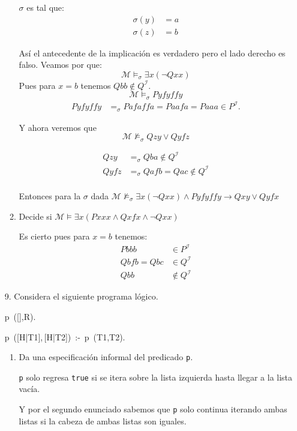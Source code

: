 \documentclass[11pt,letterpaper]{article}
\begin{document}
\begin{enumerate}
\begin{enumerate}
    $\sigma$ es tal que:
    \begin{align*}
      \sigma(y) &= a\\
      \sigma(z) &= b
    \end{align*}

    Así el antecedente de la implicación es verdadero pero
    el lado derecho es falso. Veamos por que:
    $$\mathcal{M}\models_\sigma \exists x(\neg Qxx)$$
    Pues para $x = b$ tenemos $Qbb\notin Q^\mathcal{I}$.
    $$\mathcal{M}\models_\sigma Pyfyffy$$
    \begin{align*}
      Pyfyffy &=_\sigma Pafaffa = Paafa = Paaa \in P^\mathcal{I}.
    \end{align*}

    Y ahora veremos que
    $$\mathcal{M} \not\models_\sigma  Qzy \lor Qyfz$$

    \begin{align*}
      Qzy &=_\sigma Q ba \notin Q^\mathcal{I}\\
      Qyfz &=_\sigma Q afb = Qac \notin Q^\mathcal{I}\\
    \end{align*}

    Entonces para la $\sigma$ dada     $\mathcal{M} \not\models_\sigma \exists x(\neg Qxx) \land P yfyffy
    \rightarrow Qxy \lor Qyfx$
  \item  Decide si $\mathcal{M} \models \exists x(P xxx \land Qxfx \land\neg Qxx)$
    
    Es cierto pues para $x=b$ tenemos:
    \begin{align*}
      P bbb &\in P^\mathcal{I}\\
      Qbfb = Qbc &\in Q^\mathcal{I} \\
      Qbb &\not\in Q^\mathcal{I}
    \end{align*}
  \end{enumerate}
\item[9.] Considera el siguiente programa lógico.

  \ttfamily
  p\ ([\;],R).
  
  p\ ([H|T1],\,[H|T2])\ :-\ p\ (T1,T2).
  \rmfamily

  \begin{enumerate}
  \item Da una especificación informal del predicado {\tt p}.

    {\tt p} solo regresa {\tt true} si se itera sobre la lista izquierda
    hasta llegar a la lista vacía.

    Y por el segundo enunciado sabemos que {\tt p} solo continua iterando
    ambas listas si la cabeza de ambas listas son iguales.


\end{enumerate}
\end{enumerate}
\end{document}
